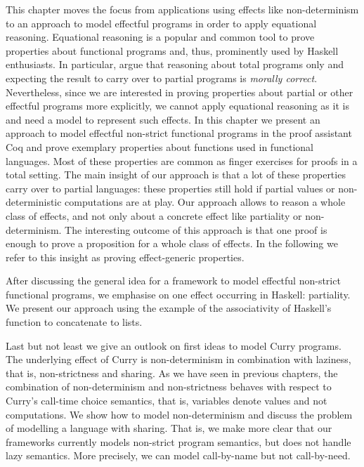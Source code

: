 
This chapter moves the focus from applications using effects like non\--determinism to an approach to model effectful programs in order to apply equational reasoning.
Equational reasoning is a popular and common tool to prove properties about functional programs and, thus, prominently used by Haskell enthusiasts. \citep{jeuring2012testing, gibbons2011just, hutton2008reasoning}
In particular, \citet{danielsson2006fast} argue that reasoning about total programs only and expecting the result to carry over to partial programs is \textit{morally correct}.
Nevertheless, since we are interested in proving properties about partial or other effectful programs more explicitly, we cannot apply equational reasoning as it is and need a model to represent such  effects.
In this chapter we present an approach to model effectful non\--strict functional programs in the proof assistant Coq and prove exemplary properties about functions used in functional languages.
Most of these properties are common as finger exercises for proofs in a total setting.
The main insight of our approach is that a lot of these properties carry over to partial languages: these properties still hold if partial values or non\--deterministic computations are at play.
Our approach allows to reason a whole class of effects, and not only about a concrete effect like partiality or non\--determinism.
The interesting outcome of this approach is that one proof is enough to prove a proposition for a whole class of effects.
In the following we refer to this insight as proving effect\--generic properties.

After discussing the general idea for a framework to model effectful non\--strict functional programs, we emphasise on one effect occurring in Haskell: partiality.
We present our approach using the example of the associativity of Haskell's function  to concatenate to lists.

Last but not least we give an outlook on first ideas to model Curry programs.
The underlying effect of Curry is non\--determinism in combination with laziness, that is, non\--strictness and sharing.
As we have seen in previous chapters, the combination of non\--determinism and non\--strictness behaves with respect to Curry's call\--time choice semantics, that is, variables denote values and not computations.
We show how to model non\--determinism and discuss the problem of modelling a language with sharing.
That is, we make more clear that our frameworks currently models non\--strict program semantics, but does not handle lazy semantics.
More precisely, we can model call\--by\--name but not call\--by\--need.

